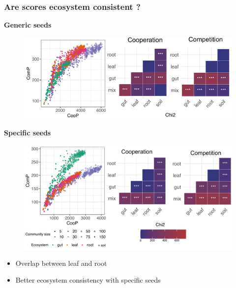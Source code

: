 \documentclass[8pt,usenames,dvipsnames]{beamer}
\begin{document}
\begin{frame}
\frametitle{Are scores ecosystem consistent ?}
\begin{minipage}{0.65\textwidth}
\textbf{Generic seeds}
\begin{figure}
\includegraphics[width=\textwidth]{figures/coop-comp-ecosys.pdf}
\end{figure}
\textbf{Specific seeds}
\begin{figure}
\includegraphics[width=\textwidth]{figures/coop-comp-ecosys-specific.pdf}
\end{figure}
\end{minipage}
\hspace{0.1cm}
\hfill
\begin{minipage}{0.3\textwidth}
\begin{block}{}
\begin{itemize}
\item Overlap between leaf and root
\item Better ecosystem consistency with specific seeds
\end{itemize}
\end{block}
\end{minipage}
\end{frame}
\end{document}
